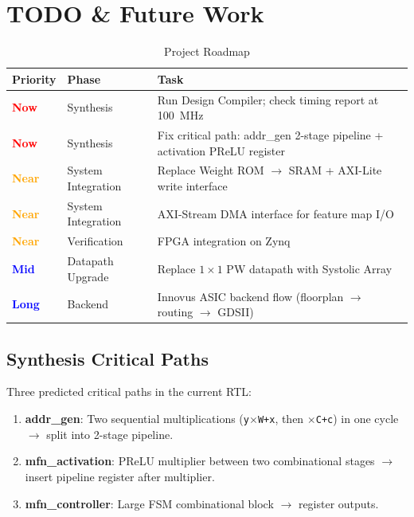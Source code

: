 \section{TODO \& Future Work}
\label{sec:todo}
 
\begin{table}[H]
\centering
\caption{Project Roadmap}
\begin{tabularx}{\textwidth}{llX}
\toprule
\textbf{Priority} & \textbf{Phase} & \textbf{Task} \\
\midrule
\textcolor{red}{\textbf{Now}}      & Synthesis          & Run Design Compiler; check timing report at 100~MHz \\
\textcolor{red}{\textbf{Now}}      & Synthesis          & Fix critical path: addr\_gen 2-stage pipeline + activation PReLU register \\
\textcolor{orange}{\textbf{Near}} & System Integration & Replace Weight ROM $\rightarrow$ SRAM + AXI-Lite write interface \\
\textcolor{orange}{\textbf{Near}} & System Integration & AXI-Stream DMA interface for feature map I/O \\
\textcolor{orange}{\textbf{Near}} & Verification       & FPGA integration on Zynq \\
\textcolor{blue}{\textbf{Mid}}    & Datapath Upgrade   & Replace $1\times1$ PW datapath with Systolic Array \\
\textcolor{blue}{\textbf{Long}}   & Backend            & Innovus ASIC backend flow (floorplan $\rightarrow$ routing $\rightarrow$ GDSII) \\
\bottomrule
\end{tabularx}
\end{table}
 
\subsection{Synthesis Critical Paths}
 
Three predicted critical paths in the current RTL:
\begin{enumerate}[nosep]
  \item \textbf{addr\_gen}: Two sequential multiplications (\texttt{y$\times$W+x},
        then \texttt{$\times$C+c}) in one cycle $\rightarrow$ split into 2-stage pipeline.
  \item \textbf{mfn\_activation}: PReLU multiplier between two combinational
        stages $\rightarrow$ insert pipeline register after multiplier.
  \item \textbf{mfn\_controller}: Large FSM combinational block
        $\rightarrow$ register outputs.
\end{enumerate}